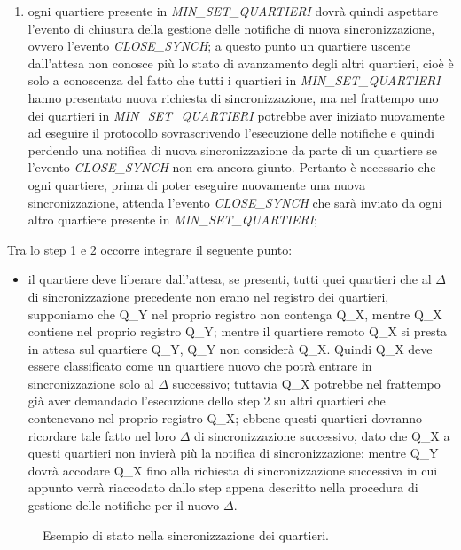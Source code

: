 \begin{enumerate}
\item ogni quartiere presente in \textit{MIN\_SET\_QUARTIERI} dovrà quindi aspettare l'evento di chiusura della gestione delle notifiche di nuova sincronizzazione, ovvero l'evento \textit{CLOSE\_SYNCH}; a questo punto un quartiere uscente dall'attesa non conosce più lo stato di avanzamento degli altri quartieri, cioè è solo a conoscenza del fatto che tutti i quartieri in \textit{MIN\_SET\_QUARTIERI} hanno presentato nuova richiesta di sincronizzazione, ma nel frattempo uno dei quartieri in \textit{MIN\_SET\_QUARTIERI} potrebbe aver iniziato nuovamente ad eseguire il protocollo sovrascrivendo l'esecuzione delle notifiche e quindi perdendo una notifica di nuova sincronizzazione da parte di un quartiere se l'evento \textit{CLOSE\_SYNCH} non era ancora giunto. Pertanto è necessario che ogni quartiere, prima di poter eseguire nuovamente una nuova sincronizzazione, attenda l'evento \textit{CLOSE\_SYNCH} che sarà inviato da ogni altro quartiere presente in \textit{MIN\_SET\_QUARTIERI};
\end{enumerate}
Tra lo step 1 e 2 occorre integrare il seguente punto:  
\begin{itemize}
\item il quartiere deve liberare dall'attesa, se presenti, tutti quei quartieri che al $\Delta$ di sincronizzazione precedente non erano nel registro dei quartieri, supponiamo che Q\_Y nel proprio registro non contenga Q\_X, mentre Q\_X contiene nel proprio registro Q\_Y; mentre il quartiere remoto Q\_X si presta in attesa sul quartiere Q\_Y, Q\_Y non considerà Q\_X. Quindi Q\_X deve essere classificato come un quartiere nuovo che potrà entrare in sincronizzazione solo al $\Delta$ successivo; tuttavia Q\_X potrebbe nel frattempo già aver demandado l'esecuzione dello step 2 su altri quartieri che contenevano nel proprio registro Q\_X; ebbene questi quartieri dovranno ricordare tale fatto nel loro $\Delta$ di sincronizzazione successivo, dato che Q\_X a questi quartieri non invierà più la notifica di sincronizzazione; mentre Q\_Y dovrà accodare Q\_X fino alla richiesta di sincronizzazione successiva in cui appunto verrà riaccodato dallo step appena descritto nella procedura di gestione delle notifiche per il nuovo $\Delta$.
\end{itemize}

\begin{figure}[H] %
\caption{Esempio di stato nella sincronizzazione dei quartieri.}
\label{fig:Esempio di stato nella sincronizzazione dei quartieri}
\end{figure}

